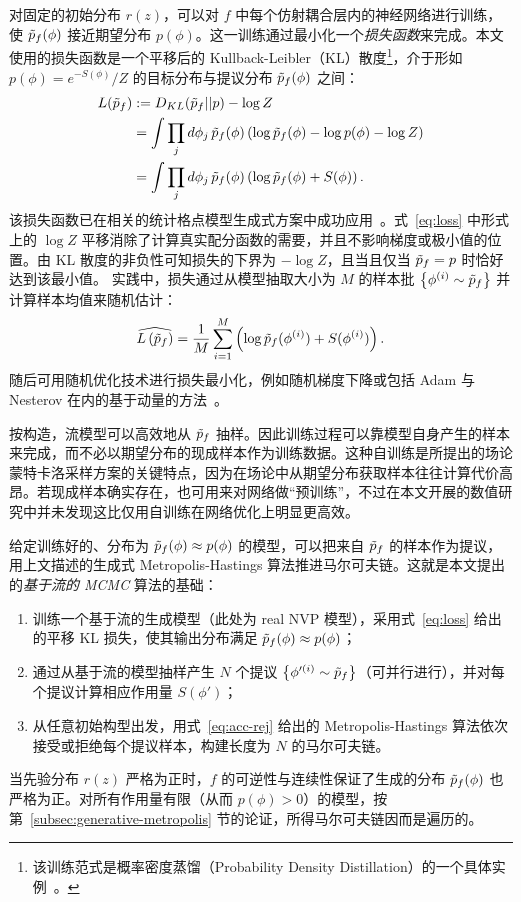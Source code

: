 对固定的初始分布 $r(z)$，可以对 $f$ 中每个仿射耦合层内的神经网络进行训练，使 $\tilde{p}_f(\phi)$ 接近期望分布 $p(\phi)$。这一训练通过最小化一个{\it 损失函数}来完成。本文使用的损失函数是一个平移后的 Kullback-Leibler（KL）散度\footnote{该训练范式是概率密度蒸馏（Probability Density Distillation）的一个具体实例~\cite{Oord2017WaveNet, Li2018}。
}，介于形如 $p(\phi) = e^{-S(\phi)}/Z$ 的目标分布与提议分布 $\tilde{p}_f(\phi)$ 之间：
%
\begin{equation}
\begin{aligned}\label{eq:loss}
L(\tilde{p}_f) &:= D_{KL}(\tilde{p}_f || p) - \log Z \\
&= \int \prod_j d\phi_j \, \tilde{p}_f(\phi) \left(\log\tilde{p}_f(\phi) - \log p(\phi) - \log Z\right) \\
&=  \int \prod_j d\phi_j \, \tilde{p}_f(\phi) \left(\log\tilde{p}_f(\phi) + S(\phi)\right).
\end{aligned}
\end{equation}
%
该损失函数已在相关的统计格点模型生成式方案中成功应用~\cite{DBLP:journals/corr/abs-1809-10188,Li2018}。式~\eqref{eq:loss} 中形式上的 $\log{Z}$ 平移消除了计算真实配分函数的需要，并且不影响梯度或极小值的位置。由 KL 散度的非负性可知损失的下界为 $-\log{Z}$，且当且仅当 $\tilde{p}_f = p$ 时恰好达到该最小值。
实践中，损失通过从模型抽取大小为 $M$ 的样本批 $\left\{ \phi^{(i)} \sim \tilde{p}_f \right\}$ 并计算样本均值来随机估计：
%
\begin{equation}
\begin{aligned}\label{eq:loss-batch}
    \widehat{L\left(\tilde{p}_f\right)} =
    \frac{1}{M} \sum_{i=1}^M \left(\log \tilde{p}_f(\phi^{(i)}) + S(\phi^{(i)})\right).
\end{aligned}
\end{equation}
%
随后可用随机优化技术进行损失最小化，例如随机梯度下降或包括 Adam 与 Nesterov 在内的基于动量的方法~\cite{Kingma2015Adam,nesterov1983}。

按构造，流模型可以高效地从 $\tilde{p}_f$ 抽样。因此训练过程可以靠模型自身产生的样本来完成，而不必以期望分布的现成样本作为训练数据。这种自训练是所提出的场论蒙特卡洛采样方案的关键特点，因为在场论中从期望分布获取样本往往计算代价高昂。若现成样本确实存在，也可用来对网络做``预训练''，不过在本文开展的数值研究中并未发现这比仅用自训练在网络优化上明显更高效。

给定训练好的、分布为 $\tilde{p}_f(\phi) \approx p(\phi)$ 的模型，可以把来自 $\tilde{p}_f$ 的样本作为提议，用上文描述的生成式 Metropolis-Hastings 算法推进马尔可夫链。这就是本文提出的\emph{基于流的 MCMC} 算法的基础：
\begin{enumerate}
    \item 训练一个基于流的生成模型（此处为 real NVP 模型），采用式~\eqref{eq:loss} 给出的平移 KL 损失，使其输出分布满足 $\tilde{p}_f(\phi) \approx p(\phi)$；
    \item 通过从基于流的模型抽样产生 $N$ 个提议 $\left\{ \phi'^{(i)} \sim \tilde{p}_f \right\}$（可并行进行），并对每个提议计算相应作用量 $S(\phi')$；
    \item 从任意初始构型出发，用式~\eqref{eq:acc-rej} 给出的 Metropolis-Hastings 算法依次接受或拒绝每个提议样本，构建长度为 $N$ 的马尔可夫链。
\end{enumerate}
%
当先验分布 $r(z)$ 严格为正时，$f$ 的可逆性与连续性保证了生成的分布 $\tilde{p}_f(\phi)$ 也严格为正。对所有作用量有限（从而 $p(\phi) > 0$）的模型，按第~\ref{subsec:generative-metropolis} 节的论证，所得马尔可夫链因而是遍历的。


